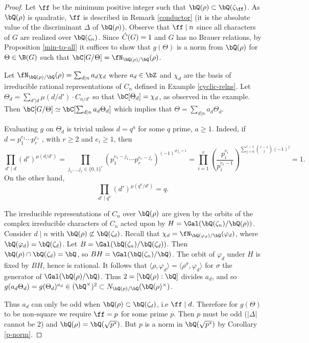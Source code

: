 \begin{proof}
    Let $\ff$ be the minimum positive integer such that $\bQ(\rho) \subset \bQ(\zeta_{\ff})$. As $\bQ(\rho)$ is quadratic, $\ff$ is described in Remark \ref{conductor} (it is the absolute value of the discriminant $\Delta$ of $\bQ(\rho)$). Observe that $\ff \mid n$ since all characters of $G$ are realized over $\bQ(\zeta_n)$. Since $\hat{C}(G) = 1$ and $G$ has no Brauer relations, by Proposition \ref{min-to-all} it suffices to show that $g(\Theta)$ is a norm from $\bQ(\rho)$ for $\Theta \in \B(G)$ such that $\bC[G / \Theta] = \repnorm{\rho}$.

    Let $\repnorm{\rho} = \sum_{d \mid n} a_d \chi_d$ where $a_d \in \bZ$ and $\chi_d$ are the basis of irreducible rational representations of $C_n$ defined in Example \ref{cyclic-relns}. %
    Let $\Theta_{d} = \sum_{d' | d}\mu(d / d')\cdot C_{n / d'}$ so that $\bC[\Theta_{d}] = \chi_{d}$, as observed in the example. Then $\bC[G / \Theta] \simeq \bC[\sum_{d | n } a_{d} \Theta_{d}]$ which implies that $\Theta = \sum_{d | n } a_{d} \Theta_{d}$.

    Evaluating $g$ on $\Theta_{d}$ is trivial unless $d = q^a$ for some $q$ prime, $a \geq 1$. Indeed, if $d = p_1^{e_1} \cdots p_r^{e_r}$ , with $r \geq 2$ and $e_i \geq 1$, then
    \[ \prod_{d' \mid d} (d')^{\mu(d / d')} = \prod_{j_1, \ldots j_r \in \{0,1\}^r } \left(p_1^{e_1 - j_1} \cdots p_r^{e_r - j_r}\right)^{(-1)^{\# j_i = 1}} = 
    \prod_{i = 1}^r \left(\frac{p_i^{e_i}}{p_i^{e_i - 1}}\right)^{\sum_{ j = 0}^{r - 1} \binom{r-1}{j} (-1)^j} = 1. \]
    On the other hand,
    \[ \prod_{d' \mid q^a} (d')^{\mu(q^a / d')} = q .\]
    
    The irreducible representations of $C_n$ over $\bQ(\rho)$ are given by the orbits of the complex irreducible characters of $C_n$ acted upon by $H = \Gal (\bQ(\zeta_n) / \bQ(\rho))$. Consider $d \mid n$ with $\bQ(\rho) \not\subset \bQ(\zeta_d)$. 
    Recall that $\chi_d = \repnorm{\varphi_d}$, where $\bQ(\varphi_d) = \bQ(\zeta_d)$. Let $B = \Gal(\bQ(\zeta_n) / \bQ(\zeta_d))$. Then $\bQ(\rho) \cap \bQ(\zeta_d) = \bQ$, so $BH = \Gal(\bQ(\zeta_n) / \bQ)$. The orbit of $\varphi_{d}$ under $H$ is fixed by $BH$, hence is rational. It follows that $\langle \rho, \varphi_{d} \rangle = \langle \rho^{\sigma} , \varphi_{d} \rangle$ for $\sigma$ the generator of $\Gal(\bQ(\rho) / \bQ)$. Thus $2 = [\bQ(\rho) : \bQ]$ divides $a_d$, and so $g(a_d \Theta_d) = g(\Theta_d)^{a_d} \in (\bQ^{\times})^2 \subset \fieldnorm{\rho}$.

    Thus $a_d$ can only be odd when $\bQ(\rho) \subset \bQ(\zeta_d)$, i.e  $\ff \mid d$. Therefore for $g(\Theta)$ to be non-square we require $\ff = p$ for some prime $p$. Then $p$ must be odd ($|\Delta|$ cannot be $2$) and $\bQ(\rho) = \bQ(\sqrt{p^*})$. But $p$ is a norm in $\bQ(\sqrt{p^*})$ by Corollary \ref{p-norm}.
\end{proof}

